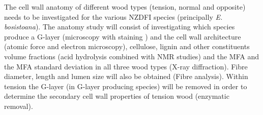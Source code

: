 The cell wall anatomy of different wood types (tension, normal and opposite)
needs to be investigated for the various NZDFI species (principally \textit{E.
bosistoana}). The anatomy study will consist of investigating which species
produce a G-layer (microscopy with staining \cite{Qiu_2008}) and the cell wall architecture
(atomic force and electron microscopy), cellulose, lignin and other constituents
volume fractions (acid hydrolysis combined with NMR studies)  and the MFA and
the MFA standard deviation in all three wood types (X-ray diffraction). Fibre
diameter, length and lumen size will also be obtained (Fibre analysis). Within
tension the G-layer (in G-layer producing species) will be
removed in order to determine the secondary cell wall properties of tension wood
(enzymatic removal).
